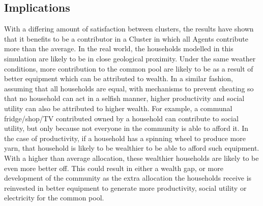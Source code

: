 \subsection*{Implications}
With a differing amount of satisfaction between clusters, the results have shown that it benefits to be a contributor in a Cluster in which all Agents contribute more than the average. In the real world, the households modelled in this simulation are likely to be in close geological proximity. Under the same weather conditions, more contribution to the common pool are likely to be as a result of better equipment which can be attributed to wealth. In a similar fashion, assuming that all households are equal, with mechanisms to prevent cheating so that no household can act in a selfish manner, higher productivity and social utility can also be attributed to higher wealth. For example, a communal fridge/shop/TV contributed owned by a household can contribute to social utility, but only because not everyone in the community is able to afford it. In the case of productivity, if a household has a spinning wheel to produce more yarn, that household is likely to be wealthier to be able to afford such equipment. 
With a higher than average allocation, these wealthier households are likely to be even more better off. This could result in either a wealth gap, or more development of the community as the extra allocation the households receive is reinvested in better equipment to generate more productivity, social utility or electricity for the common pool.
